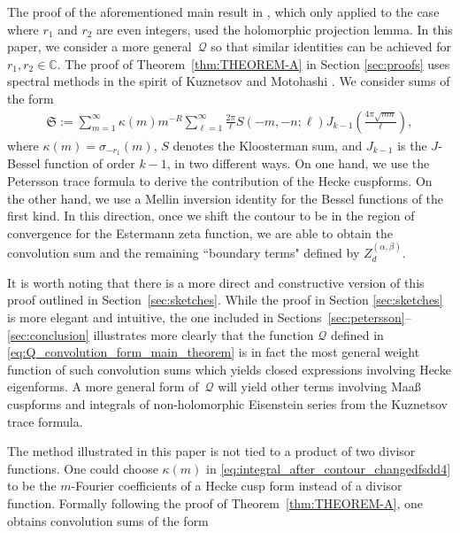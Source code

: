 \documentclass[]{article}
\newcommand{\mathcalSsumdef}{\mathfrak{S}}
\begin{document}
 The proof of the aforementioned main result in \cite{FKLR}, which only applied to the case where $r_1$ and $r_2$ are even integers, used the holomorphic projection lemma. In this paper, we consider a more general~$\mathcal{Q}$ so that similar identities can be achieved for $r_1,r_2\in\mathbb{C}$. The proof of Theorem~\ref{thm:THEOREM-A} in Section \ref{sec:proofs} uses spectral methods in the spirit of Kuznetsov and Motohashi \cites{kuznetsov1985convolution, motohashi1994binary}.
We consider sums of the form \begin{equation}\label{eq:integral_after_contour_changedfsdd4}
	\begin{split}
		\mathcalSsumdef:=  \sum_{m=1}^\infty \kappa(m) m^{-R}  \sum_{\ell=1}^\infty \frac{2 \pi }{\ell} S(-m,-n; \ell)  J_{k-1} ( \tfrac{4 \pi \sqrt{mn}}{\ell}),
	\end{split}
\end{equation} where $\kappa(m) =\sigma_{-r_1}(m)$, $S$ denotes the Kloosterman sum, and $J_{k-1}$ is the $J$-Bessel function of order $k-1$, in two different ways. On one hand, we use the Petersson trace formula to derive the contribution of the Hecke cuspforms. On the other hand, we use a Mellin inversion identity for the Bessel functions of the first kind. In this direction, once we shift the contour to be in the region of convergence for the Estermann zeta function, we are able to obtain the convolution sum and the remaining ``boundary terms" defined by $Z^{(\alpha, \beta)}_d$. 

It is worth noting that there is a more direct and constructive version of this proof outlined  in Section~\ref{sec:sketches}. While the proof in Section \ref{sec:sketches} is more elegant and intuitive, the one included in Sections~\ref{sec:petersson}--\ref{sec:conclusion} illustrates more clearly that the function $\mathcal{Q}$ defined in \eqref{eq:Q_convolution_form_main_theorem} is in fact the most general weight function of such convolution sums which  yields closed expressions involving Hecke eigenforms. A more general form of~$\mathcal{Q}$ will yield other terms involving Maa\ss\,  cuspforms and integrals of non-holomorphic Eisenstein series from the Kuznetsov trace formula. 


The method illustrated in this paper is not tied to a product of two divisor functions. One could choose $\kappa(m)$ in \eqref{eq:integral_after_contour_changedfsdd4} to be the $m$-Fourier coefficients of a Hecke cusp form instead of a divisor function. Formally following the proof of Theorem~\ref{thm:THEOREM-A}, one obtains  convolution sums of the form 
\end{document}
